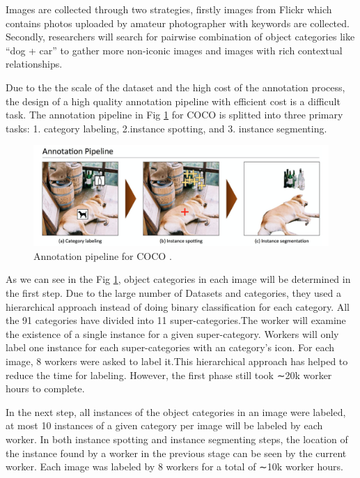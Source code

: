 \documentclass[
]{krantz}
\begin{document}
Images are collected through two strategies, firstly images from Flickr which contains photos uploaded by amateur photographer with keywords are collected. Secondly, researchers will search for pairwise combination of object categories like ``dog + car'' to gather more non-iconic images and images with rich contextual relationships.\citep{mccoco}

Due to the the scale of the dataset and the high cost of the annotation process, the design of a high quality annotation pipeline with efficient cost is a difficult task.
The annotation pipeline in Fig \ref{fig:cocoannotation} for COCO is splitted into three primary tasks: 1. category labeling, 2.instance spotting, and 3. instance segmenting.\citep{mccoco}



\begin{figure}

{\centering \includegraphics[width=1\linewidth]{figures/02-01/2.1 annotation pipeline} 

}

\caption{Annotation pipeline for COCO \citep{mccoco}.}\label{fig:cocoannotation}
\end{figure}

As we can see in the Fig \ref{fig:cocoannotation}, object categories in each image will be determined in the first step. Due to the large number of Datasets and categories, they used a hierarchical approach instead of doing binary classification for each category. All the 91 categories have divided into 11 super-categories.The worker will examine the existence of a single instance for a given super-category.
Workers will only label one instance for each super-categories with an category's icon.\citep{mccoco} For each image, 8 workers were asked to label it.This hierarchical approach has helped to reduce the time for labeling. However, the first phase still took ∼20k worker hours to complete.\citep{mccoco}

In the next step, all instances of the object categories in an image were labeled, at most 10 instances of a given category per image will be labeled by each worker. In both instance spotting and instance segmenting steps, the location of the instance found by a worker in the previous stage can be seen by the current worker. Each image was labeled by 8 workers for a total of ∼10k worker hours.\citep{mccoco}
\end{document}
